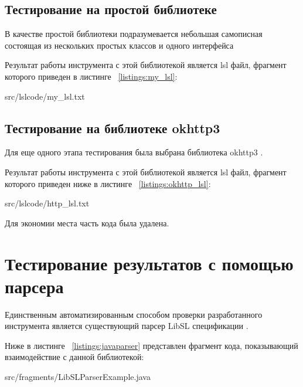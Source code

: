 \subsection{Тестирование на простой библиотеке}

В качестве простой библиотеки подразумевается небольшая самописная состоящая из нескольких простых классов и одного интерфейса

Результат работы инструмента с этой библиотекой является lsl файл, фрагмент которого приведен в листинге ~\ref{listings:my_lsl}:

{src/lslcode/my_lsl.txt}

\subsection{Тестирование на библиотеке okhttp3}

Для еще одного этапа тестирования была выбрана библиотека okhttp3 \cite{okhttp}.

Результат работы инструмента с этой библиотекой является lsl файл, фрагмент которого приведен ниже в листинге ~\ref{listings:okhttp_lsl}:

{src/lslcode/http_lsl.txt}

Для экономии места часть кода была удалена.

\section{Тестирование результатов с помощью парсера}

Единственным автоматизированным способом проверки разработанного инструмента является существующий парсер LibSL спецификации \cite{libsl_parser}.

Ниже в листинге ~\ref{listings:javaparser} представлен фрагмент кода, показывающий взаимодействие с данной библиотекой:

{src/fragments/LibSLParserExample.java}

